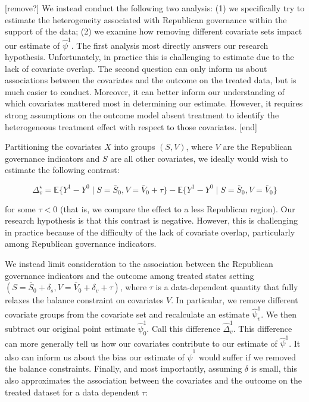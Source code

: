 \documentclass[aoas]{imsart}
\theoremstyle{plain}
\theoremstyle{remark}
\begin{document}
[remove?]
We instead conduct the following two analysis: (1) we specifically try to estimate the heterogeneity associated with Republican governance within the support of the data; (2) we examine how removing different covariate sets impact our estimate of $\hat{\psi}^1$. The first analysis most directly answers our research hypothesis. Unfortunately, in practice this is challenging to estimate due to the lack of covariate overlap. 
The second question can only inform us about associations between the covariates and the outcome on the treated data, but is much easier to conduct. Moreover, it can better inform our understanding of which covariates mattered most in determining our estimate. However, it requires strong assumptions on the outcome model absent treatment to identify the heterogeneous treatment effect with respect to those covariates.
[end]

Partitioning the covariates $X$ into groups $(S, V)$, where $V$ are the Republican governance indicators and $S$ are all other covariates, we ideally would wish to estimate the following contrast:

$$
\Delta^\star_v = \mathbb{E}\{Y^1 - Y^0 \mid S = \bar{S}_0, V = \bar{V}_0 + \tau\} - \mathbb{E}\{Y^1 - Y^0 \mid S = \bar{S}_0, V = \bar{V}_0\}
$$

for some $\tau < 0$ (that is, we compare the effect to a less Republican region). Our research hypothesis is that this contrast is negative. However, this is challenging in practice because of the difficulty of the lack of covariate overlap, particularly among Republican governance indicators. 

We instead limit consideration to the association between the Republican governance indicators and the outcome among treated states setting $(S = \bar{S}_0 + \delta_s, V = \bar{V}_0 + \delta_v + \tau)$, where $\tau$ is a data-dependent quantity that fully relaxes the balance constraint on covariates $V$. In particular, we remove different covariate groups from the covariate set and recalculate an estimate $\hat{\psi}^1_v$. We then subtract our original point estimate $\hat{\psi}^1_0$. Call this difference $\hat{\Delta}^1_v$. This difference can more generally tell us how our covariates contribute to our estimate of $\hat{\psi}^1$. It also can inform us about the bias our estimate of $\hat{\psi}^1$ would suffer if we removed the balance constraints. Finally, and most importantly, assuming $\delta$ is small, this also approximates the association between the covariates and the outcome on the treated dataset for a data dependent $\tau$:
\end{document}
